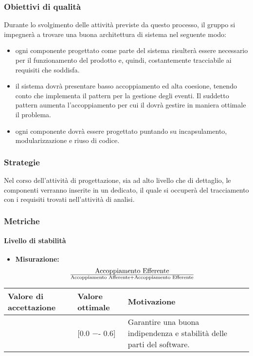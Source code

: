 \subsubsection{Obiettivi di qualità}
Durante lo svolgimento delle attività previste da questo processo, il gruppo si impegnerà a trovare una buona architettura di sistema nel seguente modo:
\begin{itemize}
\item ogni componente progettato come parte del sistema risulterà essere necessario per il funzionamento del prodotto e, quindi, costantemente tracciabile ai requisiti che soddisfa.
\item il sistema dovrà presentare basso accoppiamento ed alta coesione, tenendo conto che  implementa il pattern  per la gestione degli eventi. Il suddetto pattern aumenta l'accoppiamento per cui il  dovrà gestire in maniera ottimale il problema.
\item ogni componente dovrà essere progettato puntando su incapsulamento, modularizzazione e riuso di codice.
\end{itemize}
\newpage

\subsubsection{Strategie}
Nel corso dell'attività di progettazione, sia ad alto livello che di dettaglio, le componenti verranno inserite in un  dedicato, il quale si occuperà del tracciamento con i requisiti trovati nell'attività di analisi.


\subsubsection{Metriche}

\paragraph{Livello di stabilità}

\begin{itemize}
\item \textbf{Misurazione:} 
\begin{displaymath}
{\text{Accoppiamento Efferente}}\over{\text{Accoppiamento Afferente} + \text{Accoppiamento Efferente}}
\end{displaymath} 
\end{itemize}

\begin{center}
		\begin{tabular}{|P{2.5cm}|P{2.5cm}|P{6cm}|}
		\hline
			\textbf{Valore di accettazione}	& \textbf{Valore ottimale} & \textbf{Motivazione} \\
			\hline
			[0.0 −- 1] & [0.0 −- 0.6] &	Garantire una buona indipendenza e stabilità delle parti del software. \\
			\hline
			\end{tabular}
\end{center}

